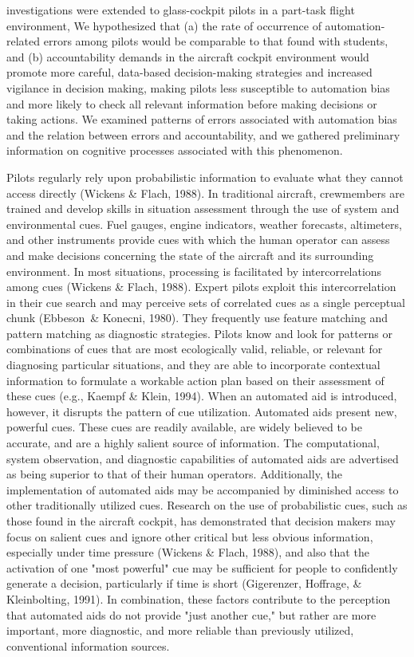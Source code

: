 \documentclass[utf8,bachelor,manualbib]{gradu3}
\begin{document}
investigations were extended to glass-cockpit pilots in a part-task flight environment,
We hypothesized that (a) the rate of occurrence of automation-related errors
among pilots would be comparable to that found with students, and (b) accountability
demands in the aircraft cockpit environment would promote more careful,
data-based decision-making strategies and increased vigilance in decision making,
making pilots less susceptible to automation bias and more likely to check all
relevant information before making decisions or taking actions. We examined
patterns of errors associated with automation bias and the relation between errors
and accountability, and we gathered preliminary information on cognitive processes
associated with this phenomenon.\citep{mosier1998}

Pilots regularly rely upon probabilistic information to evaluate what they cannot
access directly (Wickens \& Flach, 1988). In traditional aircraft, crewmembers are
trained and develop skills in situation assessment through the use of system and
environmental cues. Fuel gauges, engine indicators, weather forecasts, altimeters,
and other instruments provide cues with which the human operator can assess and
make decisions concerning the state of the aircraft and its surrounding environment.
In most situations, processing is facilitated by intercorrelations among cues (Wickens
\& Flach, 1988). Expert pilots exploit this intercorrelation in their cue search
and may perceive sets of correlated cues as a single perceptual chunk (Ebbeson\ \&
Konecni, 1980). They frequently use feature matching and pattern matching as
diagnostic strategies. Pilots know and look for patterns or combinations of cues
that are most ecologically valid, reliable, or relevant for diagnosing particular
situations, and they are able to incorporate contextual information to formulate a
workable action plan based on their assessment of these cues (e.g., Kaempf \& Klein,
1994).
When an automated aid is introduced, however, it disrupts the pattern of cue
utilization. Automated aids present new, powerful cues. These cues are readily
available, are widely believed to be accurate, and are a highly salient source of
information. The computational, system observation, and diagnostic capabilities of
automated aids are advertised as being superior to that of their human operators.
Additionally, the implementation of automated aids may be accompanied by
diminished access to other traditionally utilized cues. Research on the use of
probabilistic cues, such as those found in the aircraft cockpit, has demonstrated that
decision makers may focus on salient cues and ignore other critical but less obvious
information, especially under time pressure (Wickens \& Flach, 1988), and also that
the activation of one "most powerful" cue may be sufficient for people to confidently
generate a decision, particularly if time is short (Gigerenzer, Hoffrage, \&
Kleinbolting, 1991). In combination, these factors contribute to the perception that
automated aids do not provide "just another cue," but rather are more important,
more diagnostic, and more reliable than previously utilized, conventional information
sources. \citep{mosier1998}
\end{document}
